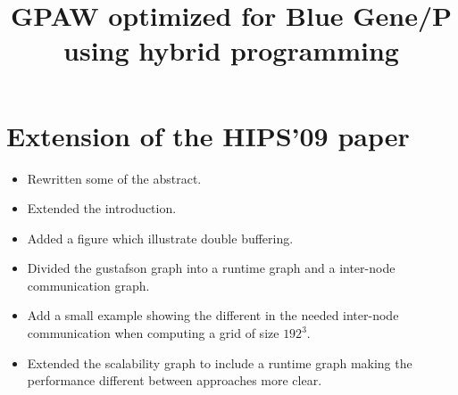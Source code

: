 \documentclass[a4paper,10pt]{article}
\title{GPAW optimized for Blue Gene/P \\ using hybrid programming}
\date{}
\begin{document}
\maketitle

\section{Extension of the HIPS'09 paper}
\begin{itemize}
 \item Rewritten some of the abstract.
 \item Extended the introduction.
 \item Added a figure which illustrate double buffering.
 \item Divided the gustafson graph into a runtime graph and a inter-node communication graph.
 \item Add a small example showing the different in the needed inter-node communication when computing a grid of size $192^3$.
 \item Extended the scalability graph to include a runtime graph making the performance different between approaches more clear.
\end{itemize}
\end{document}
